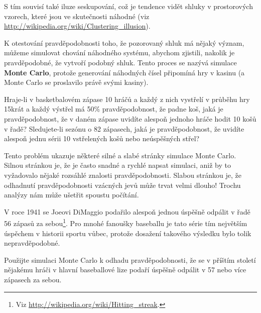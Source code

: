 \documentclass[12pt]{book}
\begin{document}
S tím souvisí také iluze seskupování, což je tendence vidět shluky v prostorových vzorech, které jsou ve skutečnosti náhodné (viz \url{http://wikipedia.org/wiki/Clustering_illusion}).

K otestování pravděpodobnosti toho, že pozorovaný shluk má nějaký význam, můžeme simulovat chování náhodného systému, abychom zjistili, nakolik je pravděpodobné, že vytvoří podobný shluk. Tento proces se nazývá simulace {\bf Monte Carlo}, protože generování náhodných čísel připomíná hry v kasinu (a Monte Carlo se proslavilo právě svými kasiny).

\begin{exercise}
Hraje-li v basketbalovém zápase 10 hráčů a každý z nich vystřelí v průběhu hry 15krát a každý výstřel má 50\% pravděpodobnost, že padne koš, jaká je pravděpodobnost, že v daném zápase uvidíte alespoň jednoho hráče hodit 10 košů v řadě? Sledujete-li sezónu o 82 zápasech, jaká je pravděpodobnost, že uvidíte alespoň jednu sérii 10 vstřelených košů nebo neúspěšných střel?

Tento problém ukazuje některé silné a slabé stránky simulace Monte
Carlo.  Silnou stránkou je, že je často snadné a rychlé napsat simulaci, aniž by to vyžadovalo nějaké rozsáhlé znalosti pravděpodobnosti. Slabou stránkou je, že odhadnutí pravděpodobnosti vzácných jevů může trvat velmi dlouho! Trochu analýzy nám může ušetřit spoustu počítání.

\end{exercise}


\begin{exercise}
V roce 1941 se Joeovi DiMaggio podařilo alespoň jednou úspěšně odpálit v řadě 56 zápasů za sebou\footnote{Viz
  \url{http://wikipedia.org/wiki/Hitting_streak}.}.  Pro mnohé fanoušky baseballu je tato série tím největším úspěchem v historii sportu vůbec, protože dosažení takového výsledku bylo tolik nepravděpodobné.

Použijte simulaci Monte Carlo k odhadu pravděpodobnosti, že se v příštím století nějakému hráči v hlavní baseballové lize podaří úspěšně odpálit v 57 nebo více zápasech za sebou.

\end{exercise}
\end{document}
